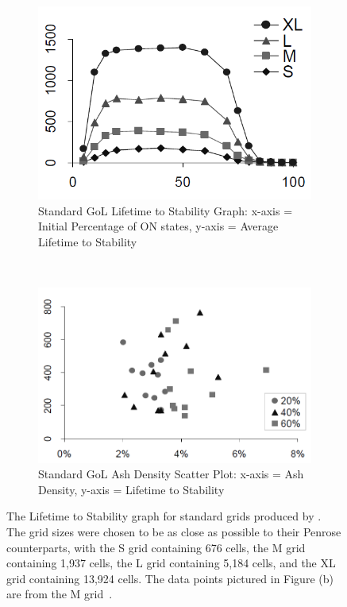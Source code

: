\documentclass[a4paper,11pt]{report}
\begin{document}
\begin{figure}[htp]
\centering
\begin{subfigure}[t]{0.6\textwidth}
	\centering
	\includegraphics[width=\textwidth]{ch4_figs/hi05_fig6_lifetime}
	\caption{Standard GoL Lifetime to Stability Graph: x-axis = Initial Percentage of ON states, y-axis = Average Lifetime to Stability}
	\label{fig:hi05_reg_lifetime}
\end{subfigure}
~
\begin{subfigure}[t]{0.6\textwidth}
	\centering
	\includegraphics[width=\textwidth]{ch4_figs/hi05_fig8_reg_ash_density}
	\caption{Standard GoL Ash Density Scatter Plot: x-axis = Ash Density, y-axis = Lifetime to Stability}
	\label{fig:hi05_reg_density}
\end{subfigure}

\caption[\citeauthor{hi05}'s Standard GoL Lifetime and Ash Density Graphs]{
	The Lifetime to Stability graph for standard grids produced by \citeauthor{hi05}. The grid sizes were chosen to be as close as possible to their Penrose counterparts, with the S grid containing 676 cells, the M grid containing 1,937 cells, the L grid containing 5,184 cells, and the XL grid containing 13,924 cells. The data points pictured in Figure (b) are from the M grid~\cite{hi05}.
}

\end{figure}
\end{document}

